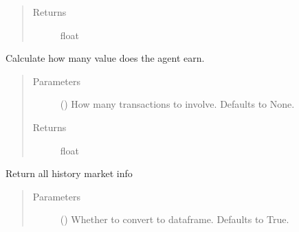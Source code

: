 \documentclass[letterpaper,10pt,english]{sphinxmanual}
\begin{document}
\begin{fulllineitems}
\begin{fulllineitems}
\begin{quote}
\begin{description}
\item[{Returns}] \leavevmode
\sphinxAtStartPar
float

\end{description}\end{quote}

\end{fulllineitems}


\begin{fulllineitems}
\label{\detokenize{Recorder:crypto_env.recorder.Recorder.get_income}}
\sphinxAtStartPar
Calculate how many value does the agent earn.
\begin{quote}\begin{description}
\item[{Parameters}] \leavevmode
\sphinxAtStartPar
{} (\sphinxstyleliteralemphasis{\sphinxupquote{, }}) \textendash{} How many transactions to involve. Defaults to None.

\item[{Returns}] \leavevmode
\sphinxAtStartPar
float

\end{description}\end{quote}

\end{fulllineitems}


\begin{fulllineitems}
\label{\detokenize{Recorder:crypto_env.recorder.Recorder.get_info_record}}
\sphinxAtStartPar
Return all history market info
\begin{quote}\begin{description}
\item[{Parameters}] \leavevmode
\sphinxAtStartPar
{} (\sphinxstyleliteralemphasis{\sphinxupquote{, }}) \textendash{} Whether to convert to dataframe. Defaults to True.


\end{description}
\end{quote}
\end{fulllineitems}
\end{fulllineitems}
\end{document}
